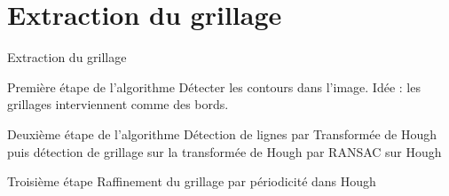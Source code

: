 \section{Extraction du grillage}

\begin{frame}{Extraction du grillage}
\begin{block}{Première étape de l'algorithme}
Détecter les contours dans l'image. Idée : les grillages interviennent comme des bords.
\end{block}
\begin{block}{Deuxième étape de l'algorithme}
Détection de lignes par Transformée de Hough puis détection de grillage sur la transformée de Hough par RANSAC sur Hough
\end{block}
\begin{block}{Troisième étape}
Raffinement du grillage par périodicité dans Hough
\end{block}
\end{frame}

